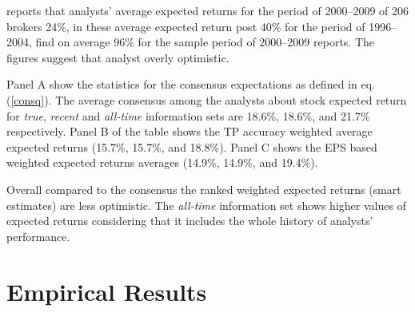 \documentclass{article}\usepackage[]{graphicx}\usepackage[]{color}
\newcommand{\tr}{\textit{true}}
\newcommand{\naive}{\textit{recent}}
\newcommand{\default}{\textit{all-time}}
\begin{document}
\cite{bradshaw2002} reports that analysts' average expected returns for the period of 2000--2009 of 206 brokers 24\%, in \cite{da2011} these average expected return post 40\% for the period of 1996--2004, \cite{zhou2013} find on average  96\% for the sample period of 2000--2009 reports. The figures suggest that analyst overly optimistic.

Panel A show the statistics for the consensus expectations as defined in eq. (\ref{consq}). The average consensus among the analysts about stock expected return for \tr{}, \naive{} and \default{} information sets are 18.6\%, 18.6\%, and 21.7\% respectively. Panel B of the table shows the TP accuracy weighted average expected returns (15.7\%, 15.7\%, and 18.8\%). Panel C shows the EPS based weighted expected returns averages (14.9\%, 14.9\%, and 19.4\%). 

Overall compared to the consensus the ranked weighted expected returns (smart estimates) are less optimistic. The \default{} information set shows higher values of expected returns considering that it includes the whole history of analysts' performance.





\section{Empirical Results}
\label{sec:results}
\end{document}
